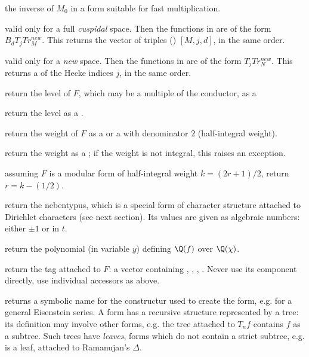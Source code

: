  the inverse of $M_0$ in a form suitable for fast
multiplication.

 valid only for a full
\emph{cuspidal} space. Then the functions in  are
of the form $B_d T_j Tr^{new}_M$. This returns the vector of triples
() $[M,j,d]$, in the same order.

 valid only for a \emph{new} space. Then
the functions in  are of the form $T_j Tr^{new}_N$. This
returns a  of the Hecke indices $j$, in the same order.


 return the level of $F$, which may be a multiple of
the conductor, as a 

 return the level as a .

 return the weight of $F$ as a 
or a  with denominator $2$ (half-integral weight).

 return the weight as a ; if the weight is
not integral, this raises an exception.

 assuming $F$ is a modular form of half-integral
weight $k = (2r+1)/2$, return $r = k - (1/2)$.

 return the nebentypus, which is a special form of
character structure attached to Dirichlet characters (see next section). Its
values are given as algebraic numbers: either $\pm1$ or 
in $t$.

 return the polynomial (in variable $y$)
 defining $\Q(f)$ over $\Q(\chi)$.

 return the tag attached to $F$: a vector containing
, , , . Never use its component directly,
use individual accessors as above.

 returns a symbolic name for the constructur
used to create the form, e.g.  for a general Eisenstein
series. A form has a recursive structure represented by a tree: its
definition may involve other forms, e.g. the tree attached to $T_n f$
contains $f$ as a subtree. Such trees have \emph{leaves}, forms
which do not contain a strict subtree, e.g.  is a leaf,
attached to Ramanujan's $\Delta$.

